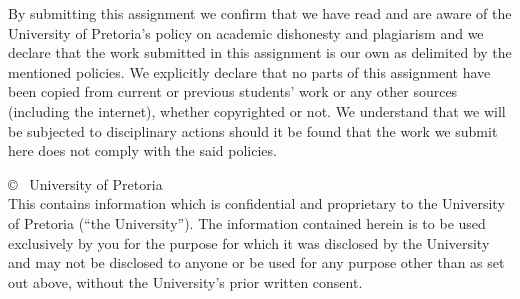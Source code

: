 \begin{titlepage}
    \noindent By submitting this assignment we confirm that we have read and are aware of the University of Pretoria's policy on academic dishonesty and plagiarism and we declare that the work submitted in this assignment is our own as delimited by the mentioned policies. We explicitly declare that no parts of this assignment have been copied from current or previous students' work or any other sources (including the internet), whether copyrighted or not. We understand that we will be subjected to disciplinary actions should it be found that the work we submit here does not comply with the said policies.
    
    
	
    \vfill
  
    \scriptsize%
    \noindent%
    \copyright~\number\year{} University of Pretoria \\
    This contains information which is confidential and proprietary to the University of Pretoria (``the
    University''). The information contained herein is to be used exclusively by you for the purpose for which it was disclosed by the University and may not be disclosed to anyone or be used for any purpose other than as set out above, without the University’s prior written consent.%


\end{titlepage}